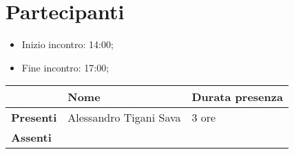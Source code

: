 \section{Partecipanti}

\begin{itemize}
    \item Inizio incontro: 14:00;
    \item Fine incontro: 17:00;
\end{itemize}


\begin{center}
{\renewcommand{\arraystretch}{1.5}
\begin{tabular}{l|ll}
	                    & \textbf{Nome}  & \textbf{Durata presenza} 	\\
	\hline
	\textbf{Presenti}   & Alessandro Tigani Sava            & 3 ore     \\
	\textbf{Assenti}	& 	                                &	        \\
\end{tabular}	
}
\end{center}